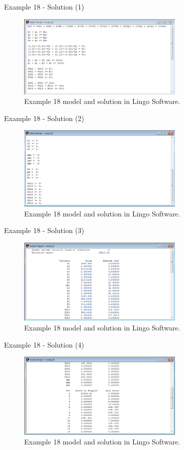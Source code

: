 \begin{frame}{Example 18 - Solution (1)}
\begin{figure}
    \includegraphics[width=300px]{slides/ex18/screenshot_a.png}
    \caption{Example 18 model and solution in Lingo Software.}
\end{figure}
\end{frame}

\begin{frame}{Example 18 - Solution (2)}
\begin{figure}
    \includegraphics[width=300px]{slides/ex18/screenshot_b.png}
    \caption{Example 18 model and solution in Lingo Software.}
\end{figure}
\end{frame}

\begin{frame}{Example 18 - Solution (3)}
\begin{figure}
    \includegraphics[width=300px]{slides/ex18/screenshot_c.png}
    \caption{Example 18 model and solution in Lingo Software.}
\end{figure}
\end{frame}

\begin{frame}{Example 18 - Solution (4)}
\begin{figure}
    \includegraphics[width=300px]{slides/ex18/screenshot_d.png}
    \caption{Example 18 model and solution in Lingo Software.}
\end{figure}
\end{frame}

